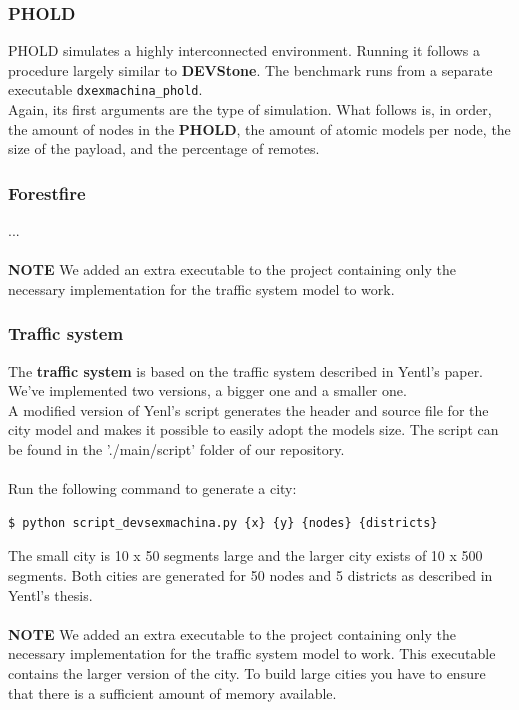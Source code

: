 \documentclass[8pt,a4paper]{report}
\begin{document}
\subsubsection{PHOLD}
PHOLD simulates a highly interconnected environment. Running it follows a procedure largely similar to \textbf{DEVStone}. The benchmark runs from a separate executable \texttt{dxexmachina\_phold}.\\
Again, its first arguments are the type of simulation. What follows is, in order, the amount of nodes in the \textbf{PHOLD}, the amount of atomic models per node, the size of the payload, and the percentage of remotes.

\subsubsection{Forestfire}
...\\
\\
\textbf{NOTE} We added an extra executable to the project containing only the necessary implementation for the traffic system model to work.

\subsubsection{Traffic system}
The \textbf{traffic system} is based on the traffic system described in Yentl's paper. We've implemented two versions, a bigger one and a smaller one.\\
A modified version of Yenl's script generates the header and source file for the city model and makes it possible to easily adopt the models size. The script can be found in the './main/script' folder of our repository.\\
\\
Run the following command to generate a city:
\begin{Verbatim}[fontsize=\small]
$ python script_devsexmachina.py {x} {y} {nodes} {districts}
\end{Verbatim}
The small city is 10 x 50 segments large and the larger city exists of 10 x 500 segments. Both cities are generated for 50 nodes and 5 districts as described in Yentl's thesis.\\
\\
\textbf{NOTE} We added an extra executable to the project containing only the necessary implementation for the traffic system model to work. This executable contains the larger version of the city. To build large cities you have to ensure that there is a sufficient amount of memory available. 
\end{document}
